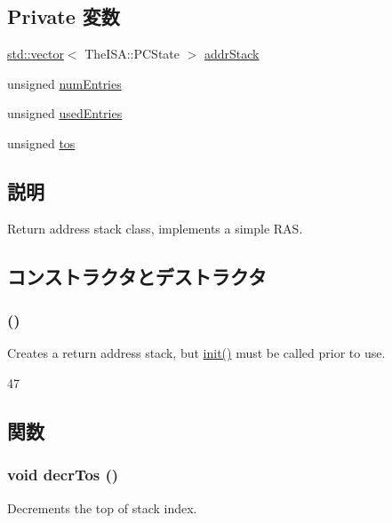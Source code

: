 \subsection*{Private 変数}
\begin{DoxyCompactItemize}
\item 
\hyperlink{classstd_1_1vector}{std::vector}$<$ TheISA::PCState $>$ \hyperlink{classReturnAddrStack_aabdf6adb15efe8a98ff6da83b4ecb30f}{addrStack}
\item 
unsigned \hyperlink{classReturnAddrStack_a325de474a9f6652329339d9fc2ea09c0}{numEntries}
\item 
unsigned \hyperlink{classReturnAddrStack_a7b4de94c51ba4a9701f0914367e0a2db}{usedEntries}
\item 
unsigned \hyperlink{classReturnAddrStack_a07d6de7b69e2f068ca2e29a4bda4749a}{tos}
\end{DoxyCompactItemize}


\subsection{説明}
Return address stack class, implements a simple RAS. 

\subsection{コンストラクタとデストラクタ}
\hypertarget{classReturnAddrStack_ad7c4f42a62f7c96cbbbbca39d1d3ec37}{
\subsubsection[{ReturnAddrStack}]{ ()}}
\label{classReturnAddrStack_ad7c4f42a62f7c96cbbbbca39d1d3ec37}
Creates a return address stack, but \hyperlink{classReturnAddrStack_a3de058721f5a8bb18c22178bac0af88d}{init()} must be called prior to use. 


\begin{DoxyCode}
47 {}
\end{DoxyCode}


\subsection{関数}
\hypertarget{classReturnAddrStack_abb9c413b66abc6c139c1a255363cc50b}{
\subsubsection[{decrTos}]{\setlength{\rightskip}{0pt plus 5cm}void decrTos ()}}
\label{classReturnAddrStack_abb9c413b66abc6c139c1a255363cc50b}
Decrements the top of stack index. 


